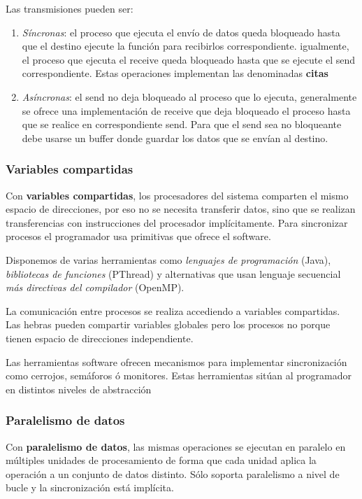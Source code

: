 \documentclass[10pt,a4paper,spanish]{report}
\begin{document}
Las transmisiones pueden ser:
\begin{enumerate}[\color{azul}{\bf $\heartsuit$}]
    \item \textcolor[rgb]{0.2,0.4,0.8}{\textit{Síncronas}}: el proceso que ejecuta el envío de datos queda bloqueado hasta que el destino ejecute la función para recibirlos correspondiente. igualmente, el proceso que ejecuta el receive queda bloqueado hasta que se ejecute el send correspondiente. Estas operaciones implementan las denominadas \textbf{\textcolor[rgb]{0.2,0.4,0.8}{citas}}
    \item \textcolor[rgb]{0.2,0.4,0.8}{\textit{Asíncronas}}: el send no deja bloqueado al proceso que lo ejecuta, generalmente se ofrece una implementación de receive que deja bloqueado el proceso hasta que se realice en correspondiente send. Para que el send sea no bloqueante debe usarse un buffer donde guardar los datos que se envían al destino.
\end{enumerate}

\textcolor[rgb]{0.2,0.4,0.8}{\subsubsection{Variables compartidas}}
Con \textcolor[rgb]{0.2,0.4,0.8}{\textbf{variables compartidas}}, los procesadores del sistema comparten el mismo espacio de direcciones, por eso no se necesita transferir datos, sino que se realizan transferencias con instrucciones del procesador implícitamente. Para sincronizar procesos el programador usa primitivas que ofrece el software.

Disponemos de varias herramientas como \textcolor[rgb]{0.2,0.4,0.8}{\textit{lenguajes de programación}} (Java), \textcolor[rgb]{0.2,0.4,0.8}{\textit{bibliotecas de funciones}} (PThread) y alternativas que usan lenguaje secuencial \textit{\textcolor[rgb]{0.2,0.4,0.8}{más directivas del compilador}} (OpenMP).

La comunicación entre procesos se realiza accediendo a variables compartidas. Las hebras pueden compartir variables globales pero los procesos no porque tienen espacio de direcciones independiente.

Las herramientas software ofrecen mecanismos para implementar sincronización como cerrojos, semáforos ó monitores. Estas herramientas sitúan al programador en distintos niveles de abstracción

\textcolor[rgb]{0.2,0.4,0.8}{\subsubsection{Paralelismo de datos}}
Con \textcolor[rgb]{0.2,0.4,0.8}{\textbf{paralelismo de datos}}, las mismas operaciones se ejecutan en paralelo en múltiples unidades de procesamiento de forma que cada unidad aplica la operación a un conjunto de datos distinto. Sólo soporta paralelismo a nivel de bucle y la sincronización está implícita. 
\end{document}
